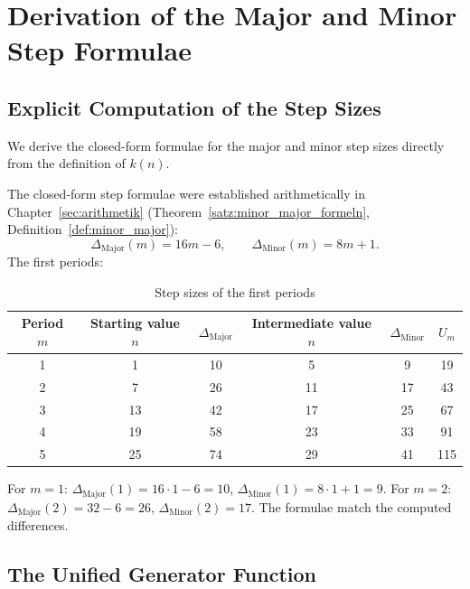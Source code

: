 \section{Derivation of the Major and Minor Step Formulae}
\label{sec:minor_major_herleitung}

\subsection{Explicit Computation of the Step Sizes}

We derive the closed-form formulae for the major and minor step sizes
directly from the definition of $k(n)$.

The closed-form step formulae were established arithmetically in
Chapter~\ref{sec:arithmetik} (Theorem~\ref{satz:minor_major_formeln},
Definition~\ref{def:minor_major}):
\[
  \Delta_{\mathrm{Major}}(m) = 16m - 6,\qquad
  \Delta_{\mathrm{Minor}}(m) = 8m + 1.
\]
The first periods:
\begin{table}[htbp]
\centering
\caption{Step sizes of the first periods}
\begin{tabular}{c|cc|cc|c}
\toprule
Period $m$ & Starting value $n$ & $\Delta_{\mathrm{Major}}$ &
Intermediate value $n$ & $\Delta_{\mathrm{Minor}}$ & $U_m$ \\
\midrule
1 & 1  & 10 & 5  & 9  & 19 \\
2 & 7  & 26 & 11 & 17 & 43 \\
3 & 13 & 42 & 17 & 25 & 67 \\
4 & 19 & 58 & 23 & 33 & 91 \\
5 & 25 & 74 & 29 & 41 & 115 \\
\bottomrule
\end{tabular}
\end{table}

\begin{remark}
For $m=1$: $\Delta_{\mathrm{Major}}(1) = 16\cdot1 - 6 = 10$,
$\Delta_{\mathrm{Minor}}(1) = 8\cdot1 + 1 = 9$.
For $m=2$: $\Delta_{\mathrm{Major}}(2) = 32-6 = 26$,
$\Delta_{\mathrm{Minor}}(2) = 17$. The formulae match the computed differences.
\end{remark}

\subsection{The Unified Generator Function}

